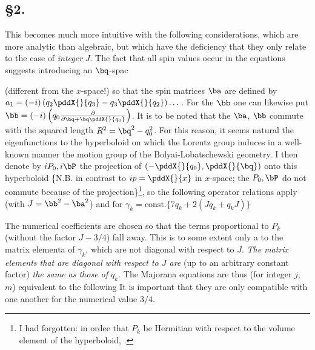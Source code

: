\subsection*{§2.} This becomes much more intuitive with the following considerations, which are more analytic than algebraic, but which have the deficiency that they only relate to the case of \textit{integer} $J$. The fact that all spin values occur in the equations suggests introducing an  $\bq$-spac

(different from the $x$-space!) so that the spin matrices $\ba$ are defined by $a_1 = (-i)\left(q_2 \pddX{}{q_3} - q_3 \pddX{}{q_2}\right)\dots$. For the $\bb$ one can likewise put $\bb = (-i)\left(q_0\frac{\partial}{\partial\bq + \bq\pddX{}{q_0}}\right)$. It is to be noted that the $\ba$, $\bb$ commute with the squared length $R^2 = \bq^2 - q_0^2$. For this reason, it seems natural  the eigenfunctions to the hyperboloid
on which the Lorentz group induces in a well-known manner the motion group of the Bolyai-Lobatschewski geometry. I then denote by $iP_0, i\bP$ the projection of $\left(-\pddX{}{q_0}, \pddX{}{\bq}\right)$ onto this hyperboloid \{N.B. in contrast to $ip=\pddX{}{x}$ in $x$-space; the $P_0, \bP$ do not commute because of the projection\}\footnote{I had forgotten: in ordee that $P_k$ be Hermitian with respect to the volume element of the hyperboloid, .}, so the following operator relations apply (with $J=\bb^2 - \ba^2$)
and for $\gamma_k=\text{const.}\{7q_k + 2(Jq_k + q_k J)\}$

The numerical coefficients are chosen so that the terms proportional to $P_k$ (without the factor $J-3/4$) fall away. This is to some extent only a  to  the matrix elementa of $\gamma_k$, which are not diagonal with respect to $J$. \textit{The matrix elements that are diagonal with respect to $J$ are} (up to an arbitrary constant factor) \textit{the same as those of $q_k$}. The Majorana equations are thus (for integer $j$, $m$) equivalent to the following
It is important that they are only compatible with one another for the numerical value $3/4$.


